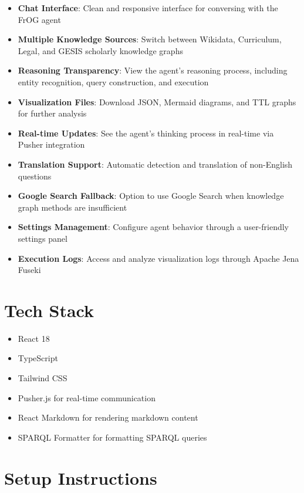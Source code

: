 \begin{itemize}
    \item \textbf{Chat Interface}: Clean and responsive interface for conversing with the FrOG agent
    \item \textbf{Multiple Knowledge Sources}: Switch between Wikidata, Curriculum, Legal, and GESIS scholarly knowledge graphs
    \item \textbf{Reasoning Transparency}: View the agent's reasoning process, including entity recognition, query construction, and execution
    \item \textbf{Visualization Files}: Download JSON, Mermaid diagrams, and TTL graphs for further analysis
    \item \textbf{Real-time Updates}: See the agent's thinking process in real-time via Pusher integration
    \item \textbf{Translation Support}: Automatic detection and translation of non-English questions
    \item \textbf{Google Search Fallback}: Option to use Google Search when knowledge graph methods are insufficient
    \item \textbf{Settings Management}: Configure agent behavior through a user-friendly settings panel
    \item \textbf{Execution Logs}: Access and analyze visualization logs through Apache Jena Fuseki
\end{itemize}

\section*{Tech Stack}

\begin{itemize}
    \item React 18
    \item TypeScript
    \item Tailwind CSS
    \item Pusher.js for real-time communication
    \item React Markdown for rendering markdown content
    \item SPARQL Formatter for formatting SPARQL queries
\end{itemize}

\section*{Setup Instructions}

